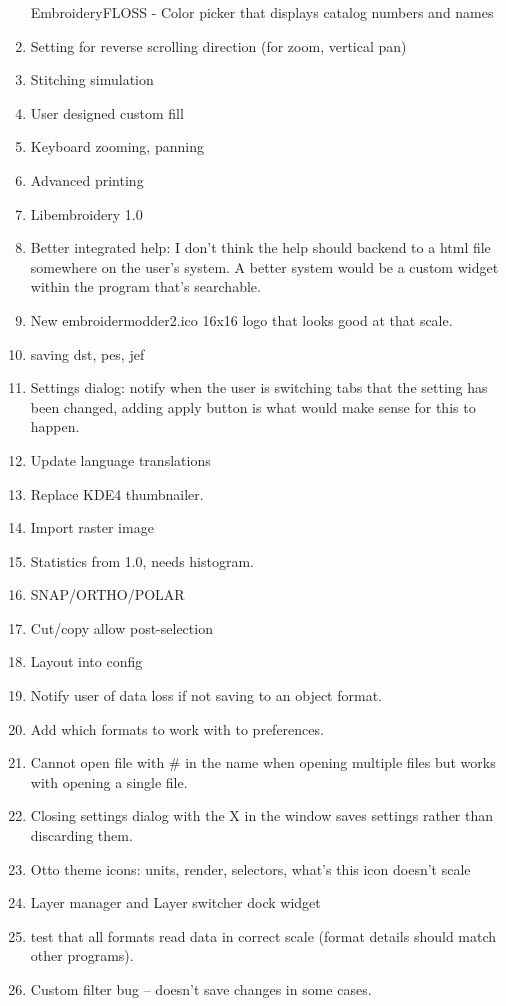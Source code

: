 \begin{enumerate}
  EmbroideryFLOSS - Color picker that displays catalog numbers and names
\item
  Setting for reverse scrolling direction (for zoom, vertical pan)
\item
  Stitching simulation
\item
  User designed custom fill
\item
  Keyboard zooming, panning
\item
  Advanced printing
\item
  Libembroidery 1.0
\item
  Better integrated help: I don't think the help should backend to a
  html file somewhere on the user's system. A better system would be a
  custom widget within the program that's searchable.
\item
  New embroidermodder2.ico 16x16 logo that looks good at that scale.
\item
  saving dst, pes, jef
\item
  Settings dialog: notify when the user is switching tabs that the
  setting has been changed, adding apply button is what would make sense
  for this to happen.
\item
  Update language translations
\item
  Replace KDE4 thumbnailer.
\item
  Import raster image
\item
  Statistics from 1.0, needs histogram.
\item
  SNAP/ORTHO/POLAR
\item
  Cut/copy allow post-selection
\item
  Layout into config
\item
  Notify user of data loss if not saving to an object format.
\item
  Add which formats to work with to preferences.
\item
  Cannot open file with \# in the name when opening multiple files but
  works with opening a single file.
\item
  Closing settings dialog with the X in the window saves settings rather
  than discarding them.
\item
  Otto theme icons: units, render, selectors, what's this icon doesn't
  scale
\item
  Layer manager and Layer switcher dock widget
\item
  test that all formats read data in correct scale (format details
  should match other programs).
\item
  Custom filter bug -- doesn't save changes in some cases.
\end{enumerate}

